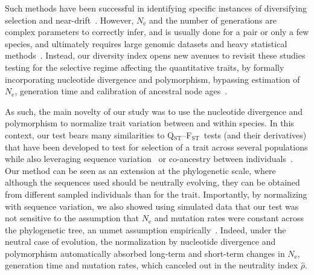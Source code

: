 \documentclass{article}
\newcommand{\Qst}{Q$_\text{ST}$}
\newcommand{\Fst}{F$_\text{ST}$}
\newcommand{\QstFst}{\Qst--\Fst}
\newcommand{\Ne}{N_{\text{e}}}
\newcommand{\EstNI}{\widehat{\rho}}
\begin{document}
Such methods have been successful in identifying specific instances of diversifying selection\citep{schroeder_evolution_2017, machado_preeminent_2022} and near-drift~\citep{machado_using_2023}.
However, $\Ne$ and the number of generations are complex parameters to correctly infer, and is usually done for a pair or only a few species, and ultimately requires large genomic datasets and heavy statistical methods~\citep{wilder_contribution_2023}.
Instead, our diversity index opens new avenues to revisit these studies testing for the selective regime affecting the quantitative traits, by formally incorporating nucleotide divergence and polymorphism, bypassing estimation of $\Ne$, generation time and calibration of ancestral node ages~\citep{machado_using_2023}.

As such, the main novelty of our study was to use the nucleotide divergence and polymorphism to normalize trait variation between and within species.
In this context, our test bears many similarities to \QstFst\ tests (and their derivatives) that have been developed to test for selection of a trait across several populations while also leveraging sequence variation~\citep{martin_multivariate_2008, leinonen_qst_2013} or co-ancestry between individuals~\citep{ovaskainen_new_2011}.
Our method can be seen as an extension at the phylogenetic scale, where although the sequences used should be neutrally evolving, they can be obtained from different sampled individuals than for the trait.
Importantly, by normalizing with sequence variation, we also showed using simulated data that our test was not sensitive to the assumption that $\Ne$ and mutation rates were constant across the phylogenetic tree, an unmet assumption empirically~\citep{bergeron_evolution_2023, wilder_contribution_2023}.
Indeed, under the neutral case of evolution, the normalization by nucleotide divergence and polymorphism automatically absorbed long-term and short-term changes in $\Ne$, generation time and mutation rates, which canceled out in the neutrality index $\EstNI$.
\end{document}
